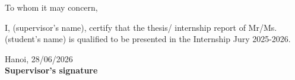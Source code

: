 \thispagestyle{empty}

\begin{center}
    {\large To whom it may concern, \par}
\end{center}
\vspace{1cm}

\noindent I, \makebox[9.5cm]{\dotfill} (supervisor's name), certify that the thesis/ internship report of Mr/Ms. \makebox[8.5cm]{\dotfill} (student's name) is qualified to be presented in the Internship Jury 2025-2026.

\vspace{3cm}

\begin{flushright}
    Hanoi, 28/06/2026 \\
    \vspace{0.5cm}
    \textbf{Supervisor's signature}
\end{flushright}
\newpage
